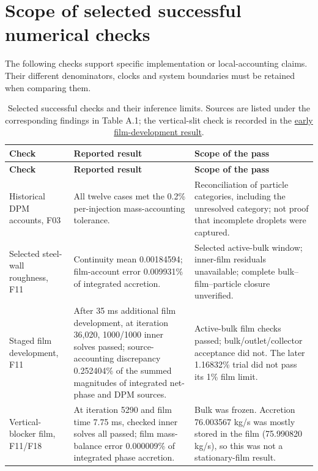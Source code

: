 \section{Scope of selected successful numerical checks}

The following checks support specific implementation or local-accounting claims. Their different denominators, clocks and system boundaries must be retained when comparing them.

\begin{longtable}{@{}>{\raggedright\arraybackslash}p{0.29000000\dimexpr\linewidth-4\tabcolsep\relax}>{\raggedright\arraybackslash}p{0.34000000\dimexpr\linewidth-4\tabcolsep\relax}>{\raggedright\arraybackslash}p{0.37000000\dimexpr\linewidth-4\tabcolsep\relax}@{}}
\caption{Selected successful checks and their inference limits. Sources are listed under the corresponding findings in Table A.1; the vertical-slit check is recorded in the \href{../../../../experiments/phase-10-proposed-design/vertical-slit154k/startup-stage3/film-development/results.md}{early film-development result}.}\label{tab:table-B.1}\\
\toprule
\textbf{Check} & \textbf{Reported result} & \textbf{Scope of the pass} \\
\midrule
\endfirsthead
\toprule
\textbf{Check} & \textbf{Reported result} & \textbf{Scope of the pass} \\
\midrule
\endhead
Historical DPM accounts, F03 & All twelve cases met the 0.2\% per-injection mass-accounting tolerance. & Reconciliation of particle categories, including the unresolved category; not proof that incomplete droplets were captured. \\
Selected steel-wall roughness, F11 & Continuity mean 0.00184594; film-account error 0.009931\% of integrated accretion. & Selected active-bulk window; inner-film residuals unavailable; complete bulk--film--particle closure unverified. \\
Staged film development, F11 & After 35 ms additional film development, at iteration 36,020, 1000/1000 inner solves passed; source-accounting discrepancy 0.252404\% of the summed magnitudes of integrated net-phase and DPM sources. & Active-bulk film checks passed; bulk/outlet/collector acceptance did not. The later 1.16832\% trial did not pass its 1\% film limit. \\
Vertical-blocker film, F11/F18 & At iteration 5290 and film time 7.75 ms, checked inner solves all passed; film mass-balance error 0.000009\% of integrated phase accretion. & Bulk was frozen. Accretion 76.003567 kg/s was mostly stored in the film (75.990820 kg/s), so this was not a stationary-film result. \\

\end{longtable}

